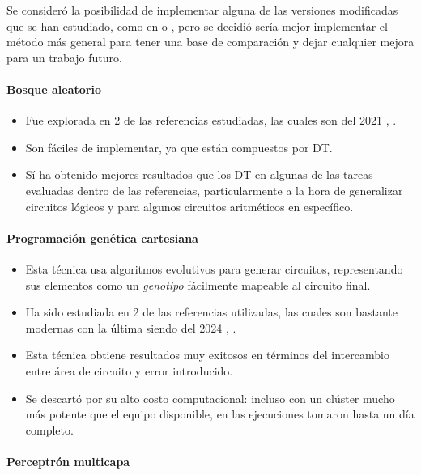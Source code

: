 Se consideró la posibilidad de implementar alguna de las versiones modificadas
que se han estudiado, como en \cite{hu_optdtals_2024} o
\cite{zeng_sampling-based_2021}, pero se decidió sería mejor implementar el
método más general para tener una base de comparación y dejar cualquier mejora
para un trabajo futuro.

\paragraph{Bosque aleatorio}

\begin{itemize}
  \item Fue explorada en 2 de las referencias estudiadas, las cuales son del
    2021 \cite{miyasaka_logic_2021}, \cite{rai_logic_2021}.
  \item Son fáciles de implementar, ya que están compuestos por DT.
  \item Sí ha obtenido mejores resultados que los DT en algunas de las tareas
    evaluadas dentro de las referencias, particularmente a la hora de
    generalizar circuitos lógicos y para algunos circuitos aritméticos en
    específico.
\end{itemize}

\paragraph{Programación genética cartesiana}

\begin{itemize}
  \item Esta técnica usa algoritmos evolutivos para generar circuitos,
    representando sus elementos como un \emph{genotipo} fácilmente mapeable
    al circuito final.
  \item Ha sido estudiada en 2 de las referencias utilizadas, las cuales son
    bastante modernas con la última siendo del 2024
    \cite{berndt_cgp-based_2022}, \cite{prats_ramos_impact_2024}.
  \item Esta técnica obtiene resultados muy exitosos en términos del
    intercambio entre área de circuito y error introducido.
  \item Se descartó por su alto costo computacional: incluso con un clúster
    mucho más potente que el equipo disponible, en
    \cite{berndt_cgp-based_2022} las ejecuciones tomaron hasta un día
    completo.
\end{itemize}

\paragraph{Perceptrón multicapa}

